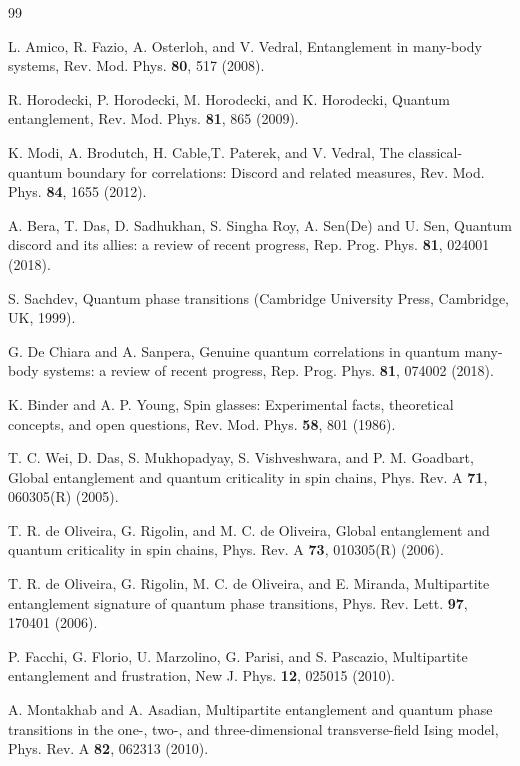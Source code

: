 \documentclass[pra,aps,twocolumn,showpacs]{revtex4}
\begin{document}
\begin{thebibliography}{99}
	
	
	
 L. Amico, R. Fazio, A. Osterloh, and V. Vedral, Entanglement in many-body systems, Rev. Mod. Phys. \textbf{80}, 517 (2008).
	
 R. Horodecki, P. Horodecki, M. Horodecki, and K. Horodecki, Quantum entanglement, Rev. Mod. Phys. \textbf{81}, 865 (2009).

 K. Modi, A. Brodutch, H. Cable,T. Paterek, and V. Vedral, The classical-quantum boundary for correlations: Discord and related measures, Rev. Mod. Phys. \textbf{84}, 1655 (2012).


   A. Bera, T. Das, D. Sadhukhan, S. Singha Roy, A. Sen(De) and U. Sen, Quantum discord and its allies: a review of recent progress, Rep. Prog. Phys. \textbf{81}, 024001 (2018).

  S. Sachdev, Quantum phase transitions (Cambridge University Press, Cambridge, UK, 1999).

 G. De Chiara and A. Sanpera, Genuine quantum correlations in quantum many-body systems: a review of recent progress, Rep. Prog. Phys. \textbf{81}, 074002 (2018).


 K. Binder and A. P. Young, Spin glasses: Experimental facts, theoretical concepts, and open questions, Rev. Mod. Phys. \textbf{58}, 801 (1986).


  T. C. Wei, D. Das, S. Mukhopadyay, S. Vishveshwara, and P. M. Goadbart, Global entanglement and quantum criticality in spin chains, Phys. Rev. A \textbf{71}, 060305(R) (2005).

  T. R. de Oliveira, G. Rigolin, and M. C. de Oliveira, Global entanglement and quantum criticality in spin chains, Phys. Rev. A \textbf{73}, 010305(R) (2006).

  T. R. de Oliveira, G. Rigolin, M. C. de Oliveira, and E. Miranda, Multipartite entanglement signature of quantum phase transitions, Phys. Rev. Lett. \textbf{97}, 170401 (2006).
	
  P. Facchi, G. Florio, U. Marzolino, G. Parisi, and S. Pascazio, Multipartite entanglement and frustration, New J. Phys. \textbf{12}, 025015 (2010).

	A. Montakhab and A. Asadian, Multipartite entanglement and quantum phase transitions in the one-, two-, and three-dimensional transverse-field Ising model, Phys. Rev. A \textbf{82}, 062313 (2010).


\end{thebibliography}
\end{document}
